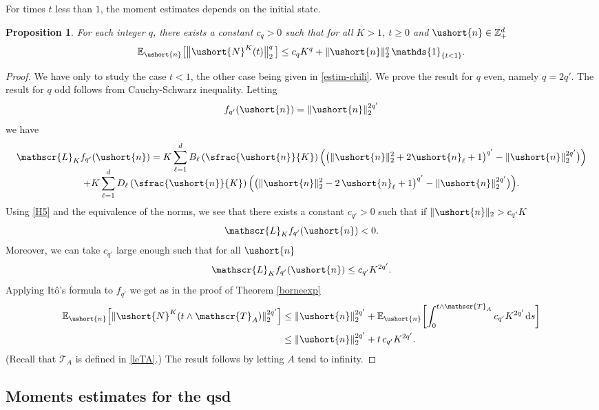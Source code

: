 \documentclass[JEP,XML,SOM,Unicode]{cedram}
\newcommand{\scaleto}[2]{#1}
\let\mathcal\mathscr
\numberwithin{equation}{section}
\theoremstyle{plain}
\newtheorem{proposition}[theorem]{Proposition}
\theoremstyle{definition}
\newcommand{\E}{{\mathbb{E}}}
\newcommand{\zentiers}{{\mathbb{Z}}}
\newcommand{\domaine}{\zentiers_{+}^{d}}
\newcommand{\sK}{K}
\newcommand{\gen}{\mathscr{L}_{\sK}}
\newcommand{\un}{\mathds{1}}
\newcommand{\vecn}{\ushort{n}}
\newcommand{\leproc}{\ushort{N}^{K}}
\newcommand{\dd}{\hspace{1pt}\mathrm{d}}
\newcommand{\normdeux}[1]{\|#1\|_{2}}\let\snormdeux\normdeux
\begin{document}
For times $t$ less than $1$, the moment estimates depends on the initial state.
\begin{proposition}\label{tempscourts}
For each integer $q$, there exists a constant $c_{q}>0$ such that for all $K>1$, $t\geq 0$ and $\vecn\in \domaine$
\[
\E_{\vecn}\bigl[\big\|\leproc(t)\big\|^{q}_{2}\,\bigr]\le c_{q} K^{q}
+\normdeux{\vecn}^{q} \, \un_{\{t< 1\}}.
\]
\end{proposition}
\begin{proof} We have only to study the case $t< 1$, the other case being given in \eqref{estim-chili}.
We prove the result for $q$ even, namely $q=\scaleto{2}{6pt}q'$. The result for $q$ odd follows from Cauchy-Schwarz inequality.
Letting
\[
f_{q'}(\vecn)=\normdeux{\vecn}^{\scaleto{2q'}{5.4pt}}
\]
we have
\begin{multline*}
\gen f_{q'}(\vecn)=K\sum_{\ell=1}^{d}B_{\ell}\left(\sfrac{\vecn}{K}\right)\Bigl(\bigl(\normdeux{\vecn}^{2}+2\vecn_{\ell}+1\bigr)^{\scaleto{q'}{6.5pt}}-
\normdeux{\vecn}^{\scaleto{2q'}{5.4pt}}\bigr)\Bigr)\\[-8pt]
+K\sum_{\ell=1}^{d}D_{\ell}\left(\sfrac{\vecn}{K}\right)\Bigl(\bigl(\normdeux{\vecn}^{2}-2\,\vecn_{\ell}+1\bigr)^{\scaleto{q'}{6.5pt}}-
\normdeux{\vecn}^{\scaleto{2q'}{5.4pt}}\bigr)\Bigr).
\end{multline*}
Using \eqref{H5} and the equivalence of the norms, we see that there exists a constant $c_{q'}>0$ such that if
$\normdeux{\vecn}> c_{q'} K$
\[
\gen f_{q'}(\vecn)<0.
\]
Moreover, we can take $c_{q'}$ large enough such that for all $\vecn$
\[
\gen f_{q'}(\vecn)\le c_{q'} K^{2q'}.
\]
Applying Itô's formula to $f_{q'}$ we get as in the proof of Theorem
\ref{borneexp}
\begin{align*}
\E_{\vecn}\Bigl[\|\leproc(t\wedge \mathcal{T}_A)\|^{\scaleto{2q'}{6pt}}_{2}\Bigr]
& \le \normdeux{\vecn}^{\scaleto{2q'}{5.3pt}}+\E_{\vecn}\biggl[\int_{0}^{t\wedge \mathcal{T}_A} c_{q'} K^{2q'}\dd s\biggr]\\
& \le \normdeux{\vecn}^{\scaleto{2q'}{5.3pt}}+t\, c_{q'} K^{2q'}.
\end{align*}
(Recall that $\mathcal{T}_A$ is defined in \eqref{leTA}.)
The result follows by letting $A$ tend to infinity.
\end{proof}

\subsection{Moments estimates for the qsd}
\end{document}
